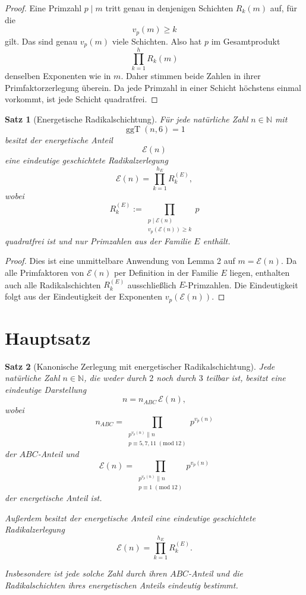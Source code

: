 \documentclass[11pt,a4paper]{article}
\newtheorem{satz}{Satz}
\theoremstyle{definition}
\theoremstyle{remark}
\newcommand{\N}{\mathbb{N}}
\newcommand{\ggT}{\operatorname{ggT}}
\newcommand{\vp}{v_p}
\begin{document}
	\begin{proof}
		Eine Primzahl \(p\mid m\) tritt genau in denjenigen Schichten \(R_k(m)\) auf, für die
		\[
		\vp(m)\ge k
		\]
		gilt. Das sind genau \(\vp(m)\) viele Schichten. Also hat \(p\) im Gesamtprodukt
		\[
		\prod_{k=1}^{h}R_k(m)
		\]
		denselben Exponenten wie in \(m\). Daher stimmen beide Zahlen in ihrer Primfaktorzerlegung überein.
		Da jede Primzahl in einer Schicht höchstens einmal vorkommt, ist jede Schicht quadratfrei.
	\end{proof}
	
	\begin{satz}[Energetische Radikalschichtung]
		Für jede natürliche Zahl \(n\in\N\) mit
		\[
		\ggT(n,6)=1
		\]
		besitzt der energetische Anteil
		\[
		\mathcal E(n)
		\]
		eine eindeutige geschichtete Radikalzerlegung
		\[
		\mathcal E(n)=\prod_{k=1}^{h_E}R_k^{(E)},
		\]
		wobei
		\[
		R_k^{(E)}:=
		\prod_{\substack{p\mid \mathcal E(n)\\ \vp(\mathcal E(n))\ge k}} p
		\]
		quadratfrei ist und nur Primzahlen aus der Familie \(E\) enthält.
	\end{satz}
	
	\begin{proof}
		Dies ist eine unmittelbare Anwendung von Lemma 2 auf \(m=\mathcal E(n)\).
		Da alle Primfaktoren von \(\mathcal E(n)\) per Definition in der Familie \(E\) liegen,
		enthalten auch alle Radikalschichten \(R_k^{(E)}\) ausschließlich \(E\)-Primzahlen.
		Die Eindeutigkeit folgt aus der Eindeutigkeit der Exponenten \(\vp(\mathcal E(n))\).
	\end{proof}
	
	\section{Hauptsatz}
	
	\begin{satz}[Kanonische Zerlegung mit energetischer Radikalschichtung]
		Jede natürliche Zahl \(n\in\N\), die weder durch \(2\) noch durch \(3\) teilbar ist, besitzt eine
		eindeutige Darstellung
		\[
		n=n_{ABC}\,\mathcal E(n),
		\]
		wobei
		\[
		n_{ABC}=
		\prod_{\substack{p^{\vp(n)}\parallel n\\ p\equiv 5,7,11\;(\mathrm{mod}\;12)}} p^{\vp(n)}
		\]
		der \(ABC\)-Anteil und
		\[
		\mathcal E(n)=
		\prod_{\substack{p^{\vp(n)}\parallel n\\ p\equiv 1\;(\mathrm{mod}\;12)}} p^{\vp(n)}
		\]
		der energetische Anteil ist.
		
		Außerdem besitzt der energetische Anteil eine eindeutige geschichtete Radikalzerlegung
		\[
		\mathcal E(n)=\prod_{k=1}^{h_E}R_k^{(E)}.
		\]
		
		Insbesondere ist jede solche Zahl durch ihren \(ABC\)-Anteil und die Radikalschichten ihres
		energetischen Anteils eindeutig bestimmt.
	\end{satz}
	
\end{document}
